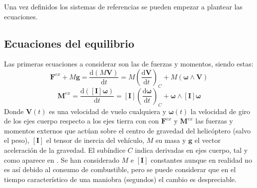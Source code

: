 Una vez definidos los sistemas de referencias se pueden empezar a plantear las ecuaciones.

\subsection{Ecuaciones del equilibrio}
Las primeras ecuaciones a considerar  son las de fuerzas y momentos, siendo estas:
\begin{equation}
\mathrm{\textbf{F}}^{ex}+M\mathrm{\textbf{g}}=\frac{\mathrm{d}(M\mathrm{\textbf{V}})}{\mathrm{d}t}=M\left(\frac{\mathrm{d\textbf{V}}}{\mathrm{d}t}\right)_{C}+M(\boldsymbol{\omega}\wedge\mathrm{\textbf{V}})
\label{EqF}
\end{equation}
\begin{equation}
\mathrm{\textbf{M}}^{ex}=\frac{\mathrm{d}([\mathrm{\textbf{I}}]\boldsymbol{\omega})}{\mathrm{d}t}=[\mathrm{\textbf{I}}]\left(\frac{\mathrm{d}\boldsymbol{\omega}}{\mathrm{d}t}\right)_C+\boldsymbol{\omega}\wedge[\mathrm{\textbf{I}}]\boldsymbol{\omega}
\label{EqM}
\end{equation}
Donde $\mathrm{\textbf{V}}(t)$ es una velocidad de vuelo cualquiera y $\boldsymbol{\omega}(t)$ la velocidad de giro de los ejes cuerpo respecto a los ejes tierra con con $\mathrm{\textbf{F}}^{ex}$ y $\mathrm{\textbf{M}}^{ex}$ las fuerzas y momentos externos que actúan sobre el centro de gravedad del helicóptero (salvo el peso), $[\mathrm{\textbf{I}}]$ el tensor de inercia del vehículo, $M$ su masa y $\mathrm{\textbf{g}}$ el vector aceleración de la gravedad. El subíndice $C$ indica derivadas en ejes cuerpo, tal y como aparece en \citet{Cuerva}. Se han considerado $M$ e $[\mathrm{\textbf{I}}]$ constantes aunque en realidad no es así debido al consumo de combustible, pero se puede considerar que en el tiempo característico de una maniobra (segundos) el cambio es despreciable.\\

